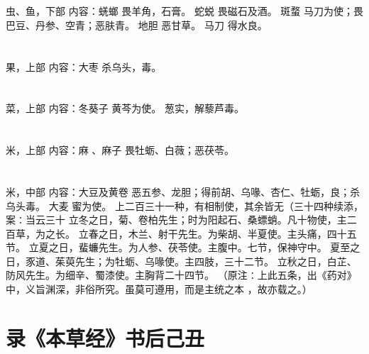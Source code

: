 \documentclass[12pt,UTF8]{ctexbook}
\begin{document}
\section{}虫、鱼，下部
内容：蜣螂 畏羊角，石膏。 
蛇蜕 畏磁石及酒。 
斑蝥 马刀为使；畏巴豆、丹参、空青；恶肤青。 
地胆 恶甘草。 
马刀 得水良。 


\section{}果，上部
内容：大枣 杀乌头，毒。 


\section{}菜，上部
内容：冬葵子 黄芩为使。 
葱实，解藜芦毒。 


\section{}米，上部
内容：麻 、麻子 畏牡蛎、白薇；恶茯苓。 


\section{}米，中部
内容：大豆及黄卷 恶五参、龙胆；得前胡、乌喙、杏仁、牡蛎，良；杀乌头毒。 
大麦 蜜为使。 
上二百三十一种，有相制使，其余皆无（三十四种续添，案∶当云三十 
立冬之日，菊、卷柏先生；时为阳起石、桑螵蛸。凡十物使，主二百草，为之长。 
立春之日，木兰、射干先生。为柴胡、半夏使。主头痛，四十五节。 
立夏之日，蜚蠊先生。为人参、茯苓使。主腹中。七节，保神守中。 
夏至之日，豕道、茱萸先生；为牡蛎、乌喙使。主四肢，三十二节。 
立秋之日，白芷、防风先生。为细辛、蜀漆使。主胸背二十四节。 
（原注∶上此五条，出《药对》中，义旨渊深，非俗所究。虽莫可遵用，而是主统之本 
，故亦载之。） 

\section{录《本草经》书后己丑}
\end{document}

